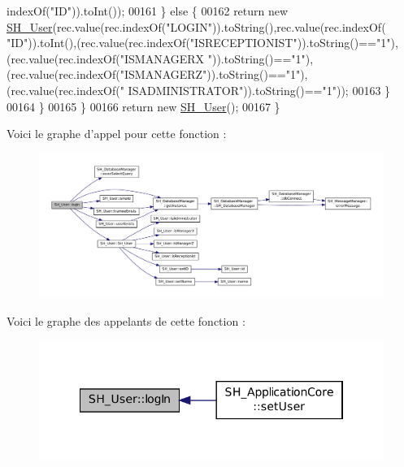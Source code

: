 \begin{DoxyCode}
      indexOf(\textcolor{stringliteral}{"ID"})).toInt());
00161             \} \textcolor{keywordflow}{else} \{
00162                 \textcolor{keywordflow}{return} \textcolor{keyword}{new} \hyperlink{classSH__User_a96c0ebb3f11c1654935aaecb92295724}{SH\_User}(rec.value(rec.indexOf(\textcolor{stringliteral}{"LOGIN"})).toString(),rec.value(rec.indexOf(\textcolor{stringliteral}{
      "ID"})).toInt(),(rec.value(rec.indexOf(\textcolor{stringliteral}{"ISRECEPTIONIST"})).toString()==\textcolor{stringliteral}{"1"}),(rec.value(rec.indexOf(\textcolor{stringliteral}{"ISMANAGERX
      "})).toString()==\textcolor{stringliteral}{"1"}),(rec.value(rec.indexOf(\textcolor{stringliteral}{"ISMANAGERZ"})).toString()==\textcolor{stringliteral}{"1"}),(rec.value(rec.indexOf(\textcolor{stringliteral}{"
      ISADMINISTRATOR"})).toString()==\textcolor{stringliteral}{"1"}));
00163             \}
00164         \}
00165     \}
00166     \textcolor{keywordflow}{return} \textcolor{keyword}{new} \hyperlink{classSH__User_a96c0ebb3f11c1654935aaecb92295724}{SH\_User}();
00167 \}
\end{DoxyCode}


Voici le graphe d'appel pour cette fonction \-:
\nopagebreak
\begin{figure}[H]
\begin{center}
\leavevmode
\includegraphics[width=350pt]{classSH__User_ad83af309786cb1ed5dbbd2cdca195c30_cgraph}
\end{center}
\end{figure}




Voici le graphe des appelants de cette fonction \-:
\nopagebreak
\begin{figure}[H]
\begin{center}
\leavevmode
\includegraphics[width=334pt]{classSH__User_ad83af309786cb1ed5dbbd2cdca195c30_icgraph}
\end{center}
\end{figure}


